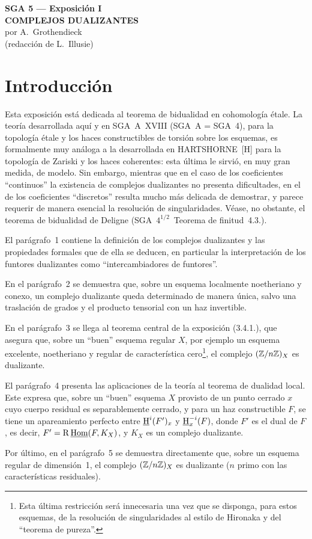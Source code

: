\begin{center}
{\Large \textbf{SGA 5 --- Exposición I}}\\[0.4em]
{\large \textbf{COMPLEJOS DUALIZANTES}}\\[0.3em]
por A.~Grothendieck\\
(redacción de L.~Illusie)
\end{center}

\section*{Introducción}

Esta exposición está dedicada al teorema de bidualidad en cohomología étale. La teoría desarrollada aquí y en SGA~A~XVIII (SGA~A = SGA~4), para la topología étale y los haces constructibles de torsión sobre los esquemas, es formalmente muy análoga a la desarrollada en HARTSHORNE~[H] para la topología de Zariski y los haces coherentes: esta última le sirvió, en muy gran medida, de modelo. Sin embargo, mientras que en el caso de los coeficientes ``continuos'' la existencia de complejos dualizantes no presenta dificultades, en el de los coeficientes ``discretos'' resulta mucho más delicada de demostrar, y parece requerir de manera esencial la resolución de singularidades. Véase, no obstante, el teorema de bidualidad de Deligne (SGA~$4^{1/2}$~Teorema de finitud~4.3.).

El parágrafo~1 contiene la definición de los complejos dualizantes y las propiedades formales que de ella se deducen, en particular la interpretación de los funtores dualizantes como ``intercambiadores de funtores''.

En el parágrafo~2 se demuestra que, sobre un esquema localmente noetheriano y conexo, un complejo dualizante queda determinado de manera única, salvo una traslación de grados y el producto tensorial con un haz invertible.

En el parágrafo~3 se llega al teorema central de la exposición (3.4.1.), que asegura que, sobre un ``buen'' esquema regular $X$, por ejemplo un esquema excelente, noetheriano y regular de característica cero\footnote{Esta última restricción será innecesaria una vez que se disponga, para estos esquemas, de la resolución de singularidades al estilo de Hironaka y del ``teorema de pureza''.}, el complejo $(\mathbb{Z}/n\mathbb{Z})_X$ es dualizante.

El parágrafo~4 presenta las aplicaciones de la teoría al teorema de dualidad local. Este expresa que, sobre un ``buen'' esquema $X$ provisto de un punto cerrado $x$ cuyo cuerpo residual es separablemente cerrado, y para un haz constructible $F$, se tiene un apareamiento perfecto entre $\underline{\mathrm{H}}^i(F')_x$ y $\underline{\mathrm{H}}^{-i}_x(F)$, donde $F'$ es el dual de $F$, es decir, $F' = \mathrm{R}\,\underline{\operatorname{Hom}}(F,K_X)$, y $K_X$ es un complejo dualizante.

Por último, en el parágrafo~5 se demuestra directamente que, sobre un esquema regular de dimensión~1, el complejo $(\mathbb{Z}/n\mathbb{Z})_X$ es dualizante ($n$ primo con las características residuales).
